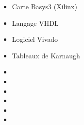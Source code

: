 \documentclass{article}
\begin{document}
\begin{tabular}
\begin{itemize}
\begin{itemize}
            \item \textcolor{gray!80}{Carte Basys3 (Xilinx)}
            \item \textcolor{gray!80}{Langage VHDL}
            \item \textcolor{gray!80}{Logiciel Vivado}
            \item \textcolor{gray!80}{Tableaux de Karnaugh}
            \item[\textcolor{white}{}] {} %
            \item[\textcolor{white}{}] {} %
            \item[\textcolor{white}{}] {} %
            \item[\textcolor{white}{}] {} %
            \item[\textcolor{white}{}] {} %
            \item[\textcolor{white}{}] {} %

        \end{itemize}
    \end{itemize}
\end{tabular}

\vfill %


\newpage
\thispagestyle{student_lab_work_ENSEA}

\vspace*{2cm}

\end{document}
